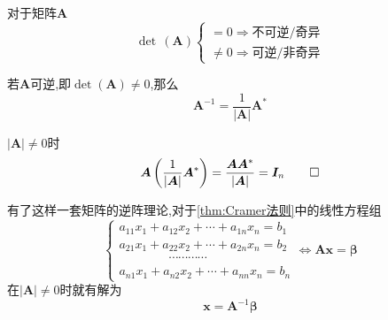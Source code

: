 \begin{formal}
\begin{theorem}[逆阵存在性]\label{thm:逆阵存在性}
    对于矩阵$\bm{A}$
    \[\det\,\left(\bm{A}\right)
    \begin{cases*}
    =0\Longrightarrow \text{不可逆/奇异}\\
    \neq 0\Longrightarrow \text{可逆/非奇异}
    \end{cases*}
    \]
\end{theorem}
\end{formal}
\begin{formal}
\begin{theorem}[逆阵与伴随]\label{thm:逆阵与伴随}
    若$\bm{A}$可逆,即$ \det\left(
        \bm{A}
    \right) \neq 0$,那么
    \[
    \bm{A}^{-1} = \frac{1}{\left|\bm{A}
    \right|} \bm{A}^*
    \]
\end{theorem}
\begin{Proof}
$\left|\bm{A}\right| \neq 0$时
\[
\bm{A}\left(\frac{1}{\left|\bm{A}\right|}\bm{A}^*\right)=
\frac{\bm{AA}^*}{\left|\bm{A}\right|}=
\bm{I}_n \qedhere
\]
\end{Proof}
\end{formal}
\begin{red}
\begin{remark}
    有了这样一套矩阵的逆阵理论,对于\cref{thm:Cramer法则}中的线性方程组
    \[
    \begin{cases*}
    a_{11}x_1+a_{12}x_2+\cdots+a_{1n}x_n=b_1\\
    a_{21}x_1+a_{22}x_2+\cdots+a_{2n}x_n=b_2\\
    \qquad\qquad\cdots\cdots\cdots\cdots\\
    a_{n1}x_1+a_{n2}x_2+\cdots+a_{nn}x_n=b_n
    \end{cases*}\Longleftrightarrow \bm{Ax}=\bm{\beta}
    \]在$\left|\bm{A}\right|\neq 0$时就有解为
    \[
    \bm{x}=\bm{A}^{-1}\bm{\beta}
    \]
\end{remark}
\end{red}
